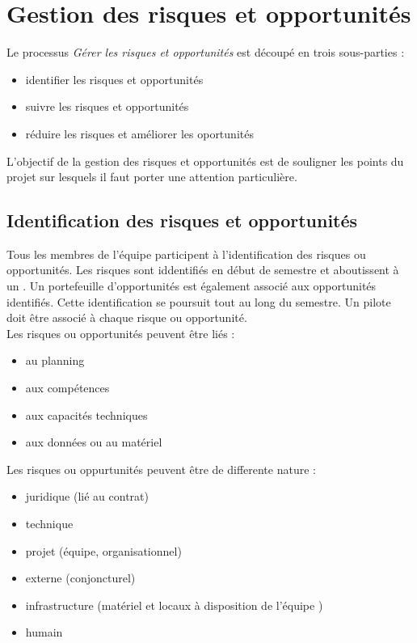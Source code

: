 \section{Gestion des risques et opportunités} 
\label{gestion_risques_opportunitees}

Le processus \textit{Gérer les risques et opportunités} est découpé en trois sous-parties : 
\begin{itemize}
\item identifier les risques et opportunités
\item suivre les risques et opportunités
\item réduire les risques et améliorer les oportunités \\
\end{itemize}

L'objectif de la gestion des risques et opportunités est de souligner les points du projet sur lesquels il faut porter une attention particulière. 

\subsection{Identification des risques et opportunités}
\label{identification_risques_opportunitees}

Tous les membres de l'équipe participent à l'identification des risques ou opportunités. Les risques sont iddentifiés en début de semestre et aboutissent à un \PR. Un portefeuille d'opportunités est également associé aux opportunités identifiés. Cette identification se poursuit tout au long du semestre. Un pilote doit être associé à chaque risque ou opportunité.\\ 

Les risques ou opportunités peuvent être liés :
\begin{itemize}
\item au planning
\item aux compétences
\item aux capacités techniques
\item aux données ou au matériel \\
\end{itemize}

Les risques ou oppurtunités peuvent être de differente nature :
\begin{itemize}
 \item juridique (lié au contrat) 
 \item technique 
 \item projet (équipe, organisationnel) 
 \item externe (conjoncturel) 
 \item infrastructure (matériel et locaux à disposition de l’équipe \PICCourt) 
 \item humain \\
\end{itemize}


